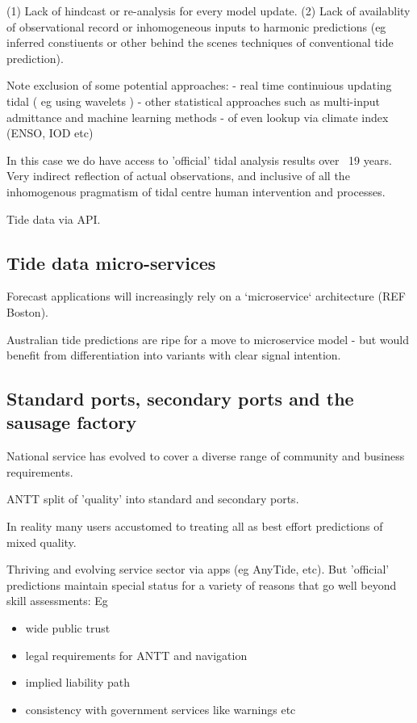 (1) Lack of hindcast or re-analysis for every model update.
(2) Lack of availablity of observational record or inhomogeneous inputs to harmonic predictions (eg inferred constiuents or other behind the scenes techniques of conventional tide prediction).

Note exclusion of some potential approaches:
- real time continuious updating tidal ( eg using wavelets )
- other statistical approaches such as multi-input admittance and machine learning methods 
- of even lookup via climate index (ENSO, IOD etc)

In this case we do have  access to 'official' tidal analysis results over ~19 years.  
Very indirect reflection of actual observations, and inclusive of all the inhomogenous pragmatism of tidal centre human intervention and processes.


Tide data via API.



\subsection{Tide data micro-services}

Forecast applications will increasingly rely on a `microservice` architecture (REF Boston).

Australian tide predictions are ripe for a move to microservice model - but would benefit from differentiation into variants with clear signal intention.

\subsection{Standard ports, secondary ports and the sausage factory}

National service has evolved to cover a diverse range of community and business requirements.

ANTT split of 'quality' into standard and secondary ports.

In reality many users accustomed to treating all as best effort predictions of mixed quality.

Thriving and evolving service sector via apps (eg AnyTide, etc).
But 'official' predictions maintain special status for a variety of reasons that go well beyond skill assessments:
Eg
\begin{itemize}
    \item wide public trust 
    \item legal requirements for ANTT and navigation
    \item implied liability path 
    \item consistency with government services like warnings etc
\end{itemize}





